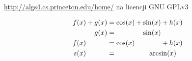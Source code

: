 
\url{http://algs4.cs.princeton.edu/home/} na licencji \textsc{GNU GPLv3}


	\begin{align*}
		f(x) +    g(x)  &=          \cos(x) +              \sin(x)             + h(x) \\
		\phantom{f(x) +{}} g(x)  &= \phantom{\cos(x) +{}}          {\sin(x)} \phantom{{}+ h(x)}\\
		f(x)  \phantom{{}+ g(x)} &=          \cos(x) \phantom{{} +  \sin(x)}            + h(x) \\
		s(x)  \phantom{{}+ g(x)} &= \phantom{\cos(x) +{}} \makebox[\widthof{$\sin(x) + h(x)$}][c]{$\arcsin(x)$}
	\end{align*}